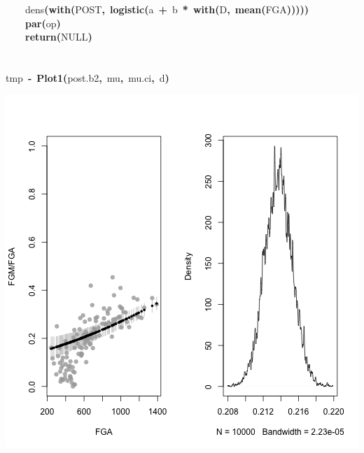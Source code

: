 \documentclass{article}
\makeatletter
\newcommand{\hlfunctioncall}[1]{\textcolor[rgb]{.5,0,.33}{\textbf{#1}}}%
\newcommand{\hlkeyword}[1]{\textbf{#1}}%
\newcommand{\hlassignement}[1]{\textbf{#1}}%
\newcommand{\hlsymbol}[1]{#1}%
\newcommand{\hlstd}[1]{\textcolor[rgb]{0,0,0}{#1}}%
\newenvironment{kframe}{%
 \def\FrameCommand##1{\hskip\@totalleftmargin \hskip-\fboxsep
 \colorbox{shadecolor}{##1}\hskip-\fboxsep
     \hskip-\linewidth \hskip-\@totalleftmargin \hskip\columnwidth}%
 \MakeFramed {\advance\hsize-\width
   \@totalleftmargin\z@ \linewidth\hsize
   \@setminipage}}%
 {\par\unskip\endMakeFramed}
\newenvironment{knitrout}{}{} %
\makeatother
\begin{document}
\begin{knitrout}
{\begin{kframe}
\begin{flushleft}
\hlstd{}{\ }{\ }{\ }{\ }\hlsymbol{dens}\hlfunctioncall{}\hlkeyword{(}\hlfunctioncall{with}\hlkeyword{(}\hlsymbol{POST}\hlkeyword{,}{\ }\hlfunctioncall{logistic}\hlkeyword{(}\hlsymbol{a}{\ }\hlkeyword{+}{\ }\hlsymbol{b}{\ }\hlkeyword{*}{\ }\hlfunctioncall{with}\hlkeyword{(}\hlsymbol{D}\hlkeyword{,}{\ }\hlfunctioncall{mean}\hlkeyword{(}\hlsymbol{FGA}\hlkeyword{)}\hlkeyword{)}\hlkeyword{)}\hlkeyword{)}\hlkeyword{)}\hspace*{\fill}\\
\hlstd{}{\ }{\ }{\ }{\ }\hlfunctioncall{par}\hlkeyword{(}\hlsymbol{op}\hlkeyword{)}\hspace*{\fill}\\
\hlstd{}{\ }{\ }{\ }{\ }\hlfunctioncall{return}\hlkeyword{(}NULL\hlkeyword{)}\hspace*{\fill}\\
\hlstd{}\hlkeyword{\usebox{\hlnormalsizeboxclosebrace}}\hspace*{\fill}\\
\hlstd{}\hspace*{\fill}\\
\hlstd{}\hlsymbol{tmp}{\ }\hlassignement{\usebox{\hlnormalsizeboxlessthan}-}{\ }\hlfunctioncall{Plot1}\hlkeyword{(}\hlsymbol{post.b2}\hlkeyword{,}{\ }\hlsymbol{mu}\hlkeyword{,}{\ }\hlsymbol{mu.ci}\hlkeyword{,}{\ }\hlsymbol{d}\hlkeyword{)}\mbox{}
\normalfont
\end{flushleft}
\includegraphics{post-bs-w-pred2} \begin{flushleft}

\end{flushleft}
\end{kframe}}
\end{knitrout}
\end{document}
